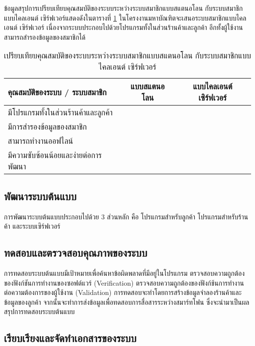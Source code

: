 \documentclass[a4paper]{article}
\newcommand{\cmark}{\ding{51}}
\newcommand{\xmark}{\ding{55}}
\begin{document}
ข้อมูลสรุปการเปรียบเทียบคุณสมบัติของระบบระหว่างระบบสมาชิกแบบสแตนอโลน กับระบบสมาชิกแบบไคลเอนต์ เซิร์ฟเวอร์แสดงดังในตารางที่ \ref{tab:compare_feature} ในโครงงานมหาบัณฑิตจะเสนอระบบสมาชิกแบบไคลเอนต์ เซิร์ฟเวอร์ เนื่องจากระบบประกอบไปด้วยโปรแกรมทั้งในส่วนร้านค้าและลูกค้า อีกทั้งผู้ใช้งานสามารถสำรองข้อมูลของสมาชิกได้ 

\begin{table}[ht!]
\centering
\begin{tabular}{ | l | c | c | }
	\hline                        
  	คุณสมบัติของระบบ / ระบบสมาชิก 		& แบบสแตนอโลน & แบบไคลเอนต์ เซิร์ฟเวอร์ \\
  	\hline 
  	มีโปรแกรมทั้งในส่วนร้านค้าและลูกค้า 		& \xmark & \cmark \\
  	\hline
  	มีการสำรองข้อมูลของสมาชิก				& \xmark & \cmark \\
  	\hline
  	สามารถทำงานออฟไลน์ 					& \cmark & \xmark \\
  	\hline
  	มีความซับซ้อนน้อยและง่ายต่อการพัฒนา		& \cmark & \xmark \\
  	\hline  
\end{tabular}
\caption{เปรียบเทียบคุณสมบัติของระบบระหว่างระบบสมาชิกแบบสแตนอโลน กับระบบสมาชิกแบบไคลเอนต์ เซิร์ฟเวอร์}
\label{tab:compare_feature}
\end{table}

\subsection{พัฒนาระบบต้นแบบ}
การพัฒนาระบบต้นแบบประกอบไปด้วย 3 ส่วนหลัก คือ โปรแกรมสำหรับลูกค้า โปรแกรมสำหรับร้านค้า และระบบเซิร์ฟเวอร์

\subsection{ทดสอบและตรวจสอบคุณภาพของระบบ}
การทดสอบระบบต้นแบบมีเป้าหมายเพื่อค้นหาข้อผิดพลาดที่มีอยู่ในโปรแกรม ตรวจสอบความถูกต้องของฟังก์ชันการทำงานของซอฟต์แวร์ (Verification) ตรวจสอบความถูกต้องของฟังก์ช้นการทํางานต่อความต้องการของผู้ใช้งาน (Validation) การทดสอบจะทำโดยการสร้างข้อมูลจำลองร้านค้าและข้อมูลของลูกค้า จากนั้นจะทำการส่งข้อมูลเพื่อทดสอบการสื่อสารระหว่างสมาร์ทโฟน ซึ่งจะนํามาเป็นผลสรุปการทดสอบระบบต้นแบบ

\subsection{เรียบเรียงและจัดทําเอกสารของระบบ}

\end{document}
